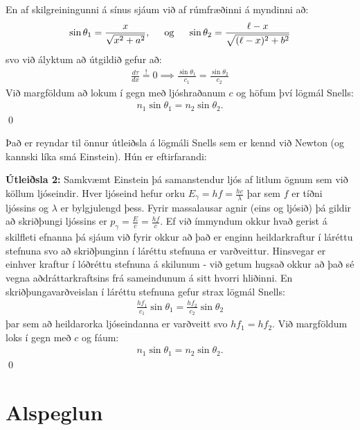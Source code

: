 \ifdefined \wholebook \else\documentclass[oneside]{book}\usepackage{EdlBook}\graphicspath{{figures/}}
\begin{document}
\vspace{0.25cm}

En af skilgreiningunni á sínus sjáum við af rúmfræðinni á myndinni að:
\begin{align*}
    \sin\theta_1 = \frac{x}{\sqrt{x^2+a^2}}, \hspace{0.5cm} \text{og} \hspace{0.5cm} \sin\theta_2 = \frac{\ell-x}{\sqrt{(\ell-x)^2+b^2}}
\end{align*}
svo við ályktum að útgildið gefur að:
\begin{align*}
   \frac{d\tau}{dx} \stackrel{!}{=} 0 \implies \frac{\sin\theta_1}{c_1} = \frac{\sin\theta_2}{c_2}
\end{align*}
Við margföldum að lokum í gegn með ljóshraðanum $c$ og höfum því lögmál Snells:
\begin{align*}
            n_1 \sin\theta_1 = n_2 \sin\theta_2.
\end{align*}
\qed

Það er reyndar til önnur útleiðsla á lögmáli Snells sem er kennd við Newton (og kannski líka smá Einstein). Hún er eftirfarandi:

\textbf{Útleiðsla 2:} Samkvæmt Einstein þá samanstendur ljós af litlum ögnum sem við köllum ljóseindir. Hver ljóseind hefur orku $E_\gamma = hf = \frac{hc}{\lambda}$ þar sem $f$ er tíðni ljóssins og $\lambda$ er bylgjulengd þess. Fyrir massalausar agnir (eins og ljósið) þá gildir að skriðþungi ljóssins er $p_\gamma = \frac{E}{c} = \frac{hf}{c}$. Ef við ímmyndum okkur hvað gerist á skilfleti efnanna þá sjáum við fyrir okkur að það er enginn heildarkraftur í láréttu stefnuna svo að skriðþunginn í láréttu stefnuna er varðveittur. Hinsvegar er einhver kraftur í lóðréttu stefnuna á skilunum - við getum hugsað okkur að það sé vegna aðdráttarkraftsins frá sameindunum á sitt hvorri hliðinni. En skriðþungavarðveislan í láréttu stefnuna gefur strax lögmál Snells:
\begin{align*}
    \frac{hf_1}{c_1}\sin\theta_1 = \frac{hf_2}{c_2}\sin\theta_2
\end{align*}
þar sem að heildarorka ljóseindanna er varðveitt svo $hf_1 = hf_2$. Við margföldum loks í gegn með $c$ og fáum:
\begin{align*}
    n_1 \sin\theta_1 = n_2 \sin\theta_2.
\end{align*}
\qed

\section{Alspeglun}
\end{document}
